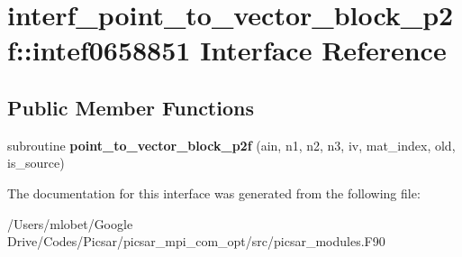 \hypertarget{interfaceinterf__point__to__vector__block__p2f_1_1intef0658851}{}\section{interf\+\_\+point\+\_\+to\+\_\+vector\+\_\+block\+\_\+p2f\+:\+:intef0658851 Interface Reference}
\label{interfaceinterf__point__to__vector__block__p2f_1_1intef0658851}
\subsection*{Public Member Functions}
\begin{DoxyCompactItemize}
\item 
subroutine {\bfseries point\+\_\+to\+\_\+vector\+\_\+block\+\_\+p2f} (ain, n1, n2, n3, iv, mat\+\_\+index, old, is\+\_\+source)\hypertarget{interfaceinterf__point__to__vector__block__p2f_1_1intef0658851_a769b513d021f33e87041882ae669bfb3}{}\label{interfaceinterf__point__to__vector__block__p2f_1_1intef0658851_a769b513d021f33e87041882ae669bfb3}

\end{DoxyCompactItemize}


The documentation for this interface was generated from the following file\+:\begin{DoxyCompactItemize}
\item 
/\+Users/mlobet/\+Google Drive/\+Codes/\+Picsar/picsar\+\_\+mpi\+\_\+com\+\_\+opt/src/picsar\+\_\+modules.\+F90\end{DoxyCompactItemize}
